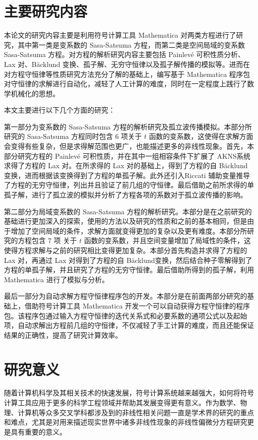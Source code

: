 \section{主要研究内容}

本论文的研究内容主要是利用符号计算工具 Mathematica 对两类方程进行了研究，其中第一类是变系数的 Sasa-Satsuma 方程，而第二类是空间局域的变系数 Sasa-Satsuma 方程。对方程的解析研究内容主要包括  Painlev\'{e} 可积性质分析、Lax 对、B\"{a}cklund 变换、孤子解、无穷守恒律以及孤子解传播的模拟等。进而在对方程守恒律等性质研究方法充分了解的基础上，编写基于 Mathematica 程序包对守恒律的求解进行自动化，减轻了人工计算的难度，同时在一定程度上践行了数学机械化的思想。

本文主要进行以下几个方面的研究：

第一部分为变系数的 Sasa-Satsuma 方程的解析研究及孤立波传播模拟。本部分所研究的  Sasa-Satsuma 方程同时包含 6 项关于 $t$ 函数的变系数，这使得在求解方面会变得有些复杂，但是求得解范围也更广，也能描述更多的非线性现象。首先，本部分研究方程的 Painlev\'{e} 可积性质，并在其中一组相容条件下扩展了 AKNS系统求得了方程的 Lax 对。在所求得的 Lax 对的基础上，得到了方程的自 B\"{a}cklund变换，进而根据该变换得到了方程的单孤子解。此外还引入Riccati 辅助变量推导了方程的无穷守恒律，列出并且验证了前几组的守恒律。最后借助之前所求得的单孤子解，进行了孤立波的模拟并分析了方程各项的系数对于孤立波传播的影响。

第二部分为局域变系数的 Sasa-Satsuma 方程的解析研究。本部分是在之前研究的基础进行更加深入的探索，使用的方法以及研究的性质和之前的基本相同，但是由于增加了空间局域的条件，求解方面就变得更加的复杂以及更有难度。本部分所研究的方程包含 7 项 关于 $t$ 函数的变系数，并且空间变量增加了局域性的条件，这使得方程求解与之前的研究相比变得更加复杂。本部分首先构造并求得了方程的 Lax 对，再通过 Lax 对得到了方程的自 B\"{a}cklund变换，然后结合种子零解得到了方程的单孤子解，并且研究了方程的无穷守恒律。最后借助所得到的孤子解，利用 Mathematica 进行了模拟与分析。

最后一部分为自动求解方程守恒律程序包的开发。本部分是在前面两部分研究的基础上，借助符号计算工具 Mathematica 开发一个可以自动获得方程守恒律的程序包。该程序包通过输入方程守恒律的迭代关系式和必要系数的通项公式以及起始项，自动求解出方程前几组的守恒律，不仅减轻了手工计算的难度，而且还能保证结果的正确性，提高了研究计算效率。

\section{研究意义}
随着计算机科学及其相关技术的快速发展，符号计算系统越来越强大，如何将符号计算工具应用于更多的科学工程领域并帮助其发展变得更有意义。作为数学、物理、计算机等众多交叉学科都涉及到的非线性相关问题一直是学术界的研究的重点和难点，尤其是对用来描述现实世界中诸多非线性现象的非线性偏微分方程研究更是具有重要的意义。


